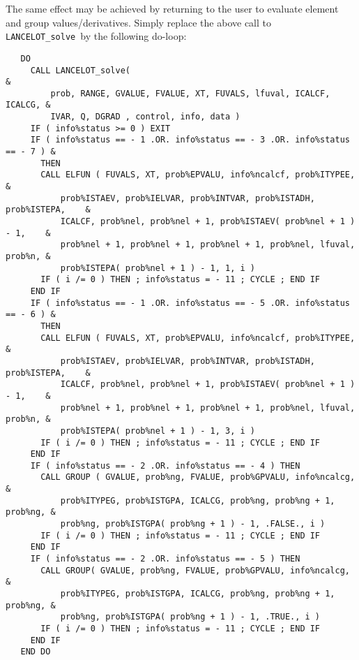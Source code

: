 \documentclass{galahad}
\newcommand{\fullpackagename}{LANC\-E\-LOT}
\newcommand{\solver}{{\tt \fullpackagename\_solve}}
\begin{document}
The same effect may be achieved by returning to the user to evaluate
element and group values/derivatives. Simply replace the above call to
\solver\ by the following do-loop:

\def\baselinestretch{0.8}
{%
{\tt \begin{verbatim}
   DO
     CALL LANCELOT_solve(                                                 &
         prob, RANGE, GVALUE, FVALUE, XT, FUVALS, lfuval, ICALCF, ICALCG, &
         IVAR, Q, DGRAD , control, info, data )
     IF ( info%status >= 0 ) EXIT
     IF ( info%status == - 1 .OR. info%status == - 3 .OR. info%status == - 7 ) &
       THEN
       CALL ELFUN ( FUVALS, XT, prob%EPVALU, info%ncalcf, prob%ITYPEE,         &
           prob%ISTAEV, prob%IELVAR, prob%INTVAR, prob%ISTADH, prob%ISTEPA,    &
           ICALCF, prob%nel, prob%nel + 1, prob%ISTAEV( prob%nel + 1 ) - 1,    &
           prob%nel + 1, prob%nel + 1, prob%nel + 1, prob%nel, lfuval, prob%n, &
           prob%ISTEPA( prob%nel + 1 ) - 1, 1, i )
       IF ( i /= 0 ) THEN ; info%status = - 11 ; CYCLE ; END IF
     END IF
     IF ( info%status == - 1 .OR. info%status == - 5 .OR. info%status == - 6 ) &
       THEN
       CALL ELFUN ( FUVALS, XT, prob%EPVALU, info%ncalcf, prob%ITYPEE,         &
           prob%ISTAEV, prob%IELVAR, prob%INTVAR, prob%ISTADH, prob%ISTEPA,    &
           ICALCF, prob%nel, prob%nel + 1, prob%ISTAEV( prob%nel + 1 ) - 1,    &
           prob%nel + 1, prob%nel + 1, prob%nel + 1, prob%nel, lfuval, prob%n, &
           prob%ISTEPA( prob%nel + 1 ) - 1, 3, i )
       IF ( i /= 0 ) THEN ; info%status = - 11 ; CYCLE ; END IF
     END IF
     IF ( info%status == - 2 .OR. info%status == - 4 ) THEN
       CALL GROUP ( GVALUE, prob%ng, FVALUE, prob%GPVALU, info%ncalcg,      &
           prob%ITYPEG, prob%ISTGPA, ICALCG, prob%ng, prob%ng + 1, prob%ng, &
           prob%ng, prob%ISTGPA( prob%ng + 1 ) - 1, .FALSE., i )
       IF ( i /= 0 ) THEN ; info%status = - 11 ; CYCLE ; END IF
     END IF
     IF ( info%status == - 2 .OR. info%status == - 5 ) THEN
       CALL GROUP( GVALUE, prob%ng, FVALUE, prob%GPVALU, info%ncalcg,       &
           prob%ITYPEG, prob%ISTGPA, ICALCG, prob%ng, prob%ng + 1, prob%ng, &
           prob%ng, prob%ISTGPA( prob%ng + 1 ) - 1, .TRUE., i )
       IF ( i /= 0 ) THEN ; info%status = - 11 ; CYCLE ; END IF
     END IF
   END DO
\end{verbatim} } }
\def\baselinestretch{1.0}
\end{document}
